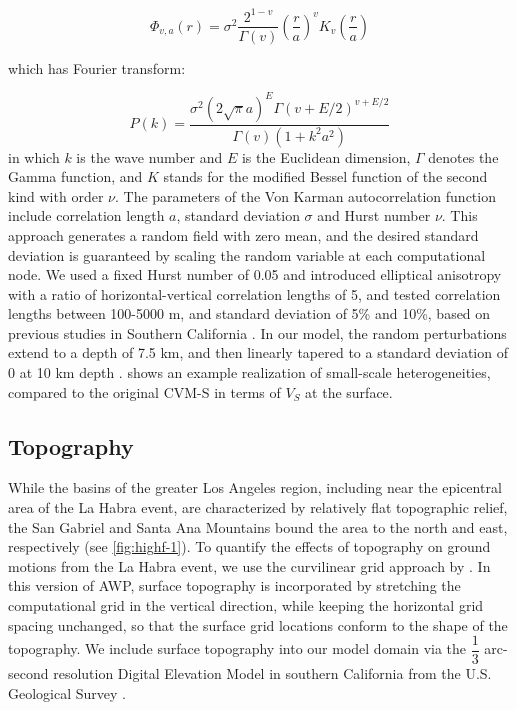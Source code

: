 \begin{equation}\label{eq:highf-1}
  \Phi_{v, a}(r)=\sigma^{2} \dfrac{2^{1-v}}{\Gamma(v)}\left(\dfrac{r}{a}\right)^{v} K_{v}\left(\dfrac{r}{a}\right)
\end{equation}

\noindent which has Fourier transform:

\begin{equation}\label{eq:highf-2}
  P(k)=\dfrac{\sigma^{2}(2 \sqrt{\pi} a)^{E} \Gamma(v+E / 2)^{v+E / 2}}{\Gamma(v)\left(1+k^{2} a^{2}\right)}
\end{equation}
\noindent in which $k$ is the wave number and $E$ is the Euclidean dimension, $\Gamma$ denotes the Gamma function, and $K$ stands for the modiﬁed Bessel function of the second kind with order $\nu$. The parameters of the Von Karman autocorrelation function include correlation length $a$, standard deviation $\sigma$ and Hurst number $\nu$. This approach generates a random field with zero mean, and the desired standard deviation is guaranteed by scaling the random variable at each computational node. We used a fixed Hurst number of 0.05 and introduced elliptical anisotropy with a ratio of horizontal-vertical correlation lengths of 5, and tested correlation lengths between 100-5000 m, and standard deviation of 5\% and 10\%, based on previous studies in Southern California . In our model, the random perturbations extend to a depth of 7.5 km, and then linearly tapered to a standard deviation of 0 at 10 km depth \citep{olsen2018constraints}.  shows an example realization of small-scale heterogeneities, compared to the original CVM-S in terms of $V_S$ at the surface.

\subsection{Topography}
While the basins of the greater Los Angeles region, including near the epicentral area of the La Habra event, are characterized by relatively flat topographic relief, the San Gabriel and Santa Ana Mountains bound the area to the north and east, respectively (see \cref{fig:highf-1}). To quantify the effects of topography on ground motions from the La Habra event, we use the curvilinear grid approach by \citet{oreillyHighorderFiniteDifference2021}. In this version of AWP, surface topography is incorporated by stretching the computational grid in the vertical direction, while keeping the horizontal grid spacing unchanged, so that the surface grid locations conform to the shape of the topography. We include surface topography into our model domain via the $\dfrac{1}{3}$ arc-second resolution Digital Elevation Model in southern California from the U.S. Geological Survey \citep{USGS3DEP}.

